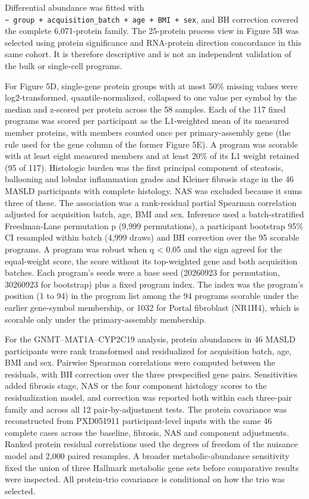 Differential abundance was fitted with \texttt{\textasciitilde{}\ group\ +\ acquisition\_\allowbreak{}batch\ +\ age\ +\ BMI\ +\ sex}, and BH correction covered the complete 6,071-protein family. The 25-protein process view in Figure 5B was selected using protein significance and RNA-protein direction concordance in this same cohort. It is therefore descriptive and is not an independent validation of the bulk or single-cell programs.

For Figure 5D, single-gene protein groups with at most 50\% missing values were log2-transformed, quantile-normalized, collapsed to one value per symbol by the median and z-scored per protein across the 58 samples. Each of the 117 fixed programs was scored per participant as the L1-weighted mean of its measured member proteins, with members counted once per primary-assembly gene (the rule used for the gene column of the former Figure 5E). A program was scorable with at least eight measured members and at least 20\% of its L1 weight retained (95 of 117). Histologic burden was the first principal component of steatosis, ballooning and lobular inflammation grades and Kleiner fibrosis stage in the 46 MASLD participants with complete histology. NAS was excluded because it sums three of these. The association was a rank-residual partial Spearman correlation adjusted for acquisition batch, age, BMI and sex. Inference used a batch-stratified Freedman-Lane permutation p (9,999 permutations), a participant bootstrap 95\% CI resampled within batch (4,999 draws) and BH correction over the 95 scorable programs. A program was robust when q \textless{} 0.05 and the sign agreed for the equal-weight score, the score without its top-weighted gene and both acquisition batches. Each program's seeds were a base seed (20260923 for permutation, 30260923 for bootstrap) plus a fixed program index. The index was the program's position (1 to 94) in the program list among the 94 programs scorable under the earlier gene-symbol membership, or 1032 for Portal fibroblast (NR1H4), which is scorable only under the primary-assembly membership.

For the GNMT--MAT1A--CYP2C19 analysis, protein abundances in 46 MASLD participants were rank transformed and residualized for acquisition batch, age, BMI and sex. Pairwise Spearman correlations were computed between the residuals, with BH correction over the three prespecified gene pairs. Sensitivities added fibrosis stage, NAS or the four component histology scores to the residualization model, and correction was reported both within each three-pair family and across all 12 pair-by-adjustment tests. The protein covariance was reconstructed from PXD051911 participant-level inputs with the same 46 complete cases across the baseline, fibrosis, NAS and component adjustments. Ranked protein residual correlations used the degrees of freedom of the nuisance model and 2,000 paired resamples. A broader metabolic-abundance sensitivity fixed the union of three Hallmark metabolic gene sets before comparative results were inspected. All protein-trio covariance is conditional on how the trio was selected.


